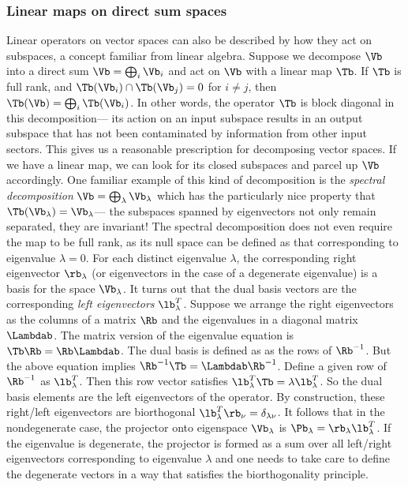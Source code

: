 \documentclass{article}
\begin{document}
\subsubsection{Linear maps on direct sum spaces}
Linear operators on vector spaces can also be described by how they act on subspaces, a concept familiar from linear algebra. Suppose we decompose $\Vb$ into a direct sum $\Vb = \bigoplus_i \Vb_i$ and act on $\Vb$ with a linear map $\Tb$. If $\Tb$ is full rank, and $\Tb(\Vb_i) \cap \Tb(\Vb_j) = 0$ for $i\neq j$, then $\Tb(\Vb) = \bigoplus_i \Tb(\Vb_i)$. In other words, the operator $\Tb$ is block diagonal in this decomposition--- its action on an input subspace results in an output subspace that has not been contaminated by information from other input sectors. This gives us a reasonable prescription for decomposing vector spaces. If we have a linear map, we can look for its closed subspaces and parcel up $\Vb$ accordingly. One familiar example of this kind of decomposition is the \textit{spectral decomposition} $\Vb = \bigoplus_\lambda \Vb_\lambda$ which has the particularly nice property that $\Tb(\Vb_\lambda) = \Vb_\lambda$--- the subspaces spanned by eigenvectors not only remain separated, they are invariant! The spectral decomposition does not even require the map to be full rank, as its null space can be defined as that corresponding to eigenvalue $\lambda = 0$. For each distinct eigenvalue $\lambda$, the corresponding right eigenvector $\rb_\lambda$ (or eigenvectors in the case of a degenerate eigenvalue) is a basis for the space $\Vb_\lambda$. It turns out that the dual basis vectors are the corresponding \textit{left eigenvectors} $\lb_\lambda^T$. Suppose we arrange the right eigenvectors as the columns of a matrix $\Rb$ and the eigenvalues in a diagonal matrix $\Lambdab$. The matrix version of the eigenvalue equation is $\Tb \Rb = \Rb \Lambdab$. The dual basis is defined as as the rows of $\Rb^{-1}$. But the above equation implies $\Rb^{-1}\Tb = \Lambdab \Rb^{-1}$. Define a given row of $\Rb^{-1}$ as $\lb_\lambda^T$. Then this row vector satisfies $\lb_\lambda^T \Tb = \lambda \lb_\lambda^T$. So the dual basis elements are the left eigenvectors of the operator. By construction, these right/left eigenvectors are biorthogonal $\lb_\lambda^T \rb_{\nu} = \delta_{\lambda\nu}$. It follows that in the nondegenerate case, the projector onto eigenspace $\Vb_\lambda$ is $\Pb_\lambda = \rb_\lambda \lb_\lambda^T$. If the eigenvalue is degenerate, the projector is formed as a sum over all left/right eigenvectors corresponding to eigenvalue $\lambda$ and one needs to take care to define the degenerate vectors in a way that satisfies the biorthogonality principle. 
\end{document}
